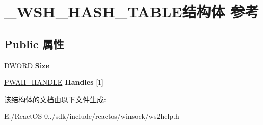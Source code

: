 \hypertarget{struct___w_s_h___h_a_s_h___t_a_b_l_e}{}\section{\+\_\+\+W\+S\+H\+\_\+\+H\+A\+S\+H\+\_\+\+T\+A\+B\+L\+E结构体 参考}
\label{struct___w_s_h___h_a_s_h___t_a_b_l_e}
\subsection*{Public 属性}
\begin{DoxyCompactItemize}
\item 
\mbox{\label{struct___w_s_h___h_a_s_h___t_a_b_l_e_ab8f59321004fda90f2815f1f513aa508}} 
D\+W\+O\+RD {\bfseries Size}
\item 
\mbox{\label{struct___w_s_h___h_a_s_h___t_a_b_l_e_a239ab78c4b812c80166ba0277c9dcfdd}} 
\hyperlink{struct___w_s_h___h_a_n_d_l_e}{P\+W\+A\+H\+\_\+\+H\+A\+N\+D\+LE} {\bfseries Handles} \mbox{[}1\mbox{]}
\end{DoxyCompactItemize}


该结构体的文档由以下文件生成\+:\begin{DoxyCompactItemize}
\item 
E\+:/\+React\+O\+S-\/0../sdk/include/reactos/winsock/ws2help.\+h\end{DoxyCompactItemize}
